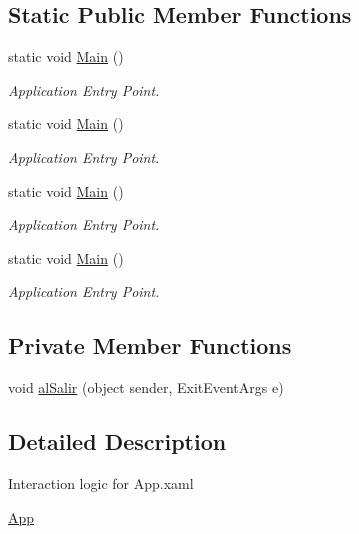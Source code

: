 \subsection*{Static Public Member Functions}
\begin{DoxyCompactItemize}
\item 
static void \hyperlink{class_asistencias__wpf_1_1_app_a6cab517d2df0e043c510a16e63b4f1ef}{Main} ()
\begin{DoxyCompactList}\small\item\em Application Entry Point. \end{DoxyCompactList}\item 
static void \hyperlink{class_asistencias__wpf_1_1_app_a6cab517d2df0e043c510a16e63b4f1ef}{Main} ()
\begin{DoxyCompactList}\small\item\em Application Entry Point. \end{DoxyCompactList}\item 
static void \hyperlink{class_asistencias__wpf_1_1_app_a6cab517d2df0e043c510a16e63b4f1ef}{Main} ()
\begin{DoxyCompactList}\small\item\em Application Entry Point. \end{DoxyCompactList}\item 
static void \hyperlink{class_asistencias__wpf_1_1_app_a6cab517d2df0e043c510a16e63b4f1ef}{Main} ()
\begin{DoxyCompactList}\small\item\em Application Entry Point. \end{DoxyCompactList}\end{DoxyCompactItemize}
\subsection*{Private Member Functions}
\begin{DoxyCompactItemize}
\item 
void \hyperlink{class_asistencias__wpf_1_1_app_a38df2651cd7e06a163ff534934e18a28}{al\-Salir} (object sender, Exit\-Event\-Args e)
\end{DoxyCompactItemize}


\subsection{Detailed Description}
Interaction logic for App.\-xaml 

\hyperlink{class_asistencias__wpf_1_1_app}{App} 

